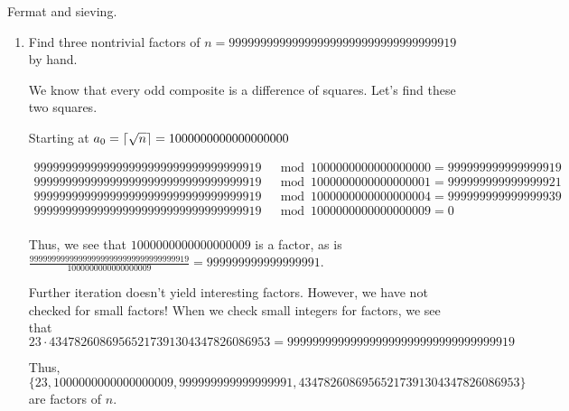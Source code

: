 \begin{problem}
  Fermat and sieving.
  \begin{enumerate}\renewcommand{\itemsep}{3mm}
    \item Find three nontrivial factors of
    $n=999999999999999999999999999999999919$ by hand.

    \begin{Answer}
      We know that every odd composite is a difference of squares.
      Let's find these two squares.

      \noindent
      Starting at $a_{0} = \lceil{} \sqrt{n} \rceil = 1000000000000000000$

      \begin{align*}
        999999999999999999999999999999999919 &\mod 1000000000000000000 = 999999999999999919\\
        999999999999999999999999999999999919 &\mod 1000000000000000001 = 999999999999999921\\
        999999999999999999999999999999999919 &\mod 1000000000000000004 = 999999999999999939\\
        999999999999999999999999999999999919 &\mod 1000000000000000009 = 0\\
      \end{align*}

      \noindent
      Thus, we see that $1000000000000000009$ is a factor,
      \newline
      as is $\frac{999999999999999999999999999999999919}{1000000000000000009}
      = 999999999999999991$.

      \noindent
      Further iteration doesn't yield interesting factors.
      However, we have not checked for small factors! When we check small integers for factors,
      we see that \newline $23 \cdot 43478260869565217391304347826086953 = 999999999999999999999999999999999919$

      \bigskip
      \noindent
      Thus, $\{23, 1000000000000000009, 999999999999999991, 43478260869565217391304347826086953\}$ are factors of $n$.
    \end{Answer}
    

\end{enumerate}
\end{problem}
